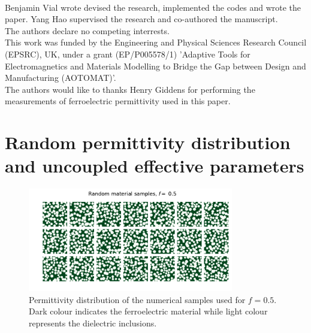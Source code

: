\documentclass[%
 aip,
 amsmath,amssymb,
 reprint,%
]{revtex4-1}
\begin{document}
\vskip6pt


\\
{Benjamin Vial wrote devised the research, implemented
the codes and wrote the paper. Yang Hao supervised the research and
co-authored the manuscript.}\\
{The authors declare no competing interrests.}\\
{This work was funded by the Engineering and Physical Sciences Research
Council (EPSRC), UK, under a grant (EP/P005578/1) 'Adaptive Tools for
Electromagnetics and Materials Modelling to Bridge the Gap between
Design and Manufacturing (AOTOMAT)'.}\\
{The authors would like to thanks Henry Giddens for performing the
measurements of ferroelectric permittivity used in this paper.}\\


\appendix

\section{Random permittivity distribution and uncoupled effective parameters}

\begin{figure}[h!]
 \centering
 \includegraphics[width=0.8\textwidth]{random_samples_f_50percent}
 \caption{Permittivity distribution of the numerical samples used for $f=0.5$. Dark
  colour indicates the ferroelectric material while light colour represents the
  dielectric inclusions.}
 \label{randmatepsi}
\end{figure}
\end{document}
